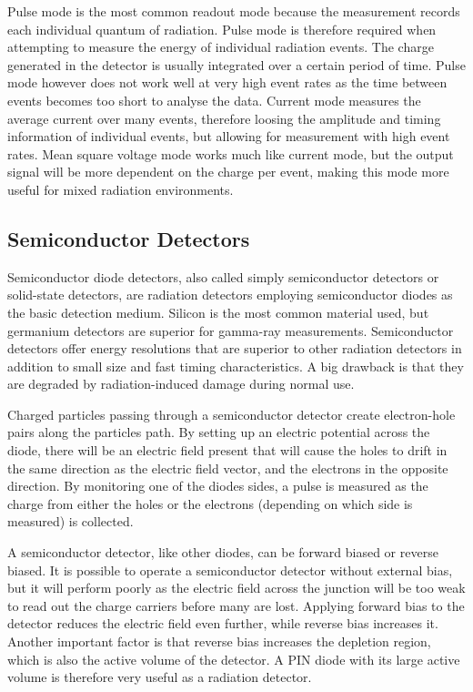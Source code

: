 \documentclass[../main/thesis.tex]{subfiles}
\begin{document}
Pulse mode is the most common readout mode because the measurement records each individual quantum of radiation. Pulse mode is therefore required when attempting to measure the energy of individual radiation events. The charge generated in the detector is usually integrated over a certain period of time. Pulse mode however does not work well at very high event rates as the time between events becomes too short to analyse the data. Current mode measures the average current over many events, therefore loosing the amplitude and timing information of individual events, but allowing for measurement with high event rates. Mean square voltage mode works much like current mode, but the output signal will be more dependent on the charge per event, making this mode more useful for mixed radiation environments. \citep[chap. 4]{Knoll}




\subsection{Semiconductor Detectors}
\label{t-semi}
Semiconductor diode detectors, also called simply semiconductor detectors or solid-state detectors, are radiation detectors employing semiconductor diodes as the basic detection medium. Silicon is the most common material used, but germanium detectors are superior for gamma-ray measurements. Semiconductor detectors offer energy resolutions that are superior to other radiation detectors in addition to small size and fast timing characteristics. A big drawback is that they are degraded by radiation-induced damage during normal use. \citep[chap. 11]{Knoll}

Charged particles passing through a semiconductor detector create electron-hole pairs along the particles path. By setting up an electric potential across the diode, there will be an electric field present that will cause the holes to drift in the same direction as the electric field vector, and the electrons in the opposite direction. By monitoring one of the diodes sides, a pulse is measured as the charge from either the holes or the electrons (depending on which side is measured) is collected. 

A semiconductor detector, like other diodes, can be forward biased or reverse biased. It is possible to operate a semiconductor detector without external bias, but it will perform poorly as the electric field across the junction will be too weak to read out the charge carriers before many are lost. Applying forward bias to the detector reduces the electric field even further, while reverse bias increases it. Another important factor is that reverse bias increases the depletion region, which is also the active volume of the detector. A PIN diode with its large active volume is therefore very useful as a radiation detector. \citep[chap. 11]{Knoll}
\end{document}
